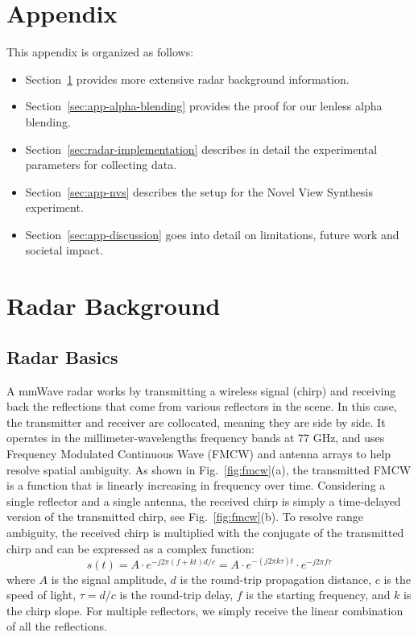 \clearpage
\appendix
\renewcommand{\thesection}{\Alph{section}}
\section*{Appendix}
This appendix is organized as follows:
\begin{itemize}
\item Section~\ref{sec:app-radar} provides more extensive radar background information.
\item Section~\ref{sec:app-alpha-blending} provides the proof for our lenless alpha blending.
\item Section~\ref{sec:radar-implementation} describes in detail the experimental parameters for collecting data.
\item Section~\ref{sec:app-nvs} describes the setup for the Novel View Synthesis experiment.
\item Section~\ref{sec:app-discussion} goes into detail on limitations, future work and societal impact.
\end{itemize}

\section{Radar Background} \label{sec:app-radar}
\subsection{Radar Basics}
A mmWave radar works by transmitting a wireless
signal (chirp) and receiving back the reflections that come from various reflectors in the scene. In this case, the transmitter and receiver are collocated, meaning they are side by side.
It operates in the millimeter-wavelengths frequency bands at 77 GHz, and uses Frequency Modulated Continuous Wave (FMCW) and antenna arrays to help resolve spatial ambiguity. 
As shown in Fig.~\ref{fig:fmcw}(a), the transmitted FMCW is a function that is linearly increasing in frequency over time. 
Considering a single reflector and a single antenna, the received chirp is simply a time-delayed version of the transmitted chirp, see Fig.~\ref{fig:fmcw}(b). 
To resolve range ambiguity, the received chirp is multiplied with the conjugate of the transmitted chirp and can be expressed as a complex function:
\begin{equation}
s(t) =  A \cdot e^{-j 2 \pi(f+kt)   d /c}  = A \cdot e^{-(j 2\pi k \tau )t} \cdot e^{-j 2\pi f \tau}
\end{equation}
where $A$ is the signal amplitude, $d$ is the round-trip propagation distance, $c$ is the speed of light, $\tau=d/c$ is the round-trip delay, $f$ is the starting frequency, and $k$ is the chirp slope. For multiple reflectors, we simply receive the linear combination of all the reflections.

